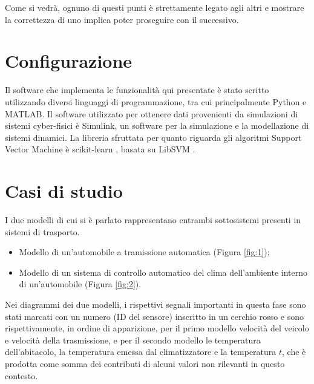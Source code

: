 \documentclass[Lau,binding=0.6cm,noexaminfo]{sapthesis}
\begin{document}
Come si vedr\`a, ognuno di questi punti \`e strettamente legato agli altri e mostrare la correttezza di uno implica poter proseguire con il successivo.

\section{Configurazione}
Il software che implementa le funzionalit\`a qui presentate \`e stato scritto utilizzando diversi linguaggi di programmazione, tra cui principalmente Python e MATLAB.
Il software utilizzato per ottenere dati provenienti da simulazioni di sistemi cyber-fisici \`e Simulink, un software per la simulazione e la modellazione di sistemi dinamici.
La libreria sfruttata per quanto riguarda gli algoritmi Support Vector Machine \`e scikit-learn \cite{pedregosa2011scikit}, basata su LibSVM \cite{chang2011libsvm}.

\newpage
\section{Casi di studio}
I due modelli di cui si \`e parlato rappresentano entrambi sottosistemi presenti in sistemi di trasporto.
\begin{itemize}
    \item Modello di un'automobile a tramissione automatica (Figura \ref{fig:1});
    \item Modello di un sistema di controllo automatico del clima dell'ambiente interno di un'automobile (Figura \ref{fig:2}).
\end{itemize}
Nei diagrammi dei due modelli, i rispettivi segnali importanti in questa fase sono stati marcati con un numero (ID del sensore) inscritto in un cerchio rosso e sono rispettivamente, 
in ordine di apparizione, per il primo modello velocit\`a del veicolo e velocit\`a della trasmissione, e per il secondo modello le temperatura dell'abitacolo, la temperatura emessa dal climatizzatore e la temperatura $t$, che \`e prodotta come somma dei contributi di alcuni valori non rilevanti in questo contesto.
\end{document}
